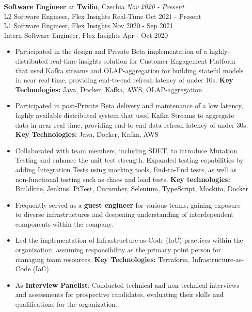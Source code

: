 
{\textbf{Software Engineer} at \textbf{Twilio}, Czechia} 
    \hfill {\em Nov 2020 - Present}\\
    {L2 Software Engineer, Flex Insights Real-Time} \hfill  {Oct 2021 - Present}\\
    {L1 Software Engineer, Flex Insights} \hfill            {Nov 2020 - Sep 2021}\\
    {Intern Software Engineer, Flex Insights} \hfill        {Apr - Oct 2020}
    \begin{itemize}
        \item Participated in the design and Private Beta implementation of a highly-distributed real-time insights solution for Customer Engagement Platform that used Kafka streams and OLAP-aggregation for building stateful models in near real time, providing end-to-end refresh latency of under 10s. \textbf{Key Technologies:} Java, Docker, Kafka, AWS, OLAP-aggregation
        \item Participated in post-Private Beta delivery and maintenance of a low latency, highly available distributed system that used Kafka Streams to aggregate data in near real time, providing end-to-end data refresh latency of under 30s. \textbf{Key Technologies:} Java, Docker, Kafka, AWS
        \item Collaborated with team members, including SDET, to introduce Mutation Testing and enhance the unit test strength. Expanded testing capabilities by adding Integration Tests using mocking tools, End-to-End tests, as well as non-functional testing such as chaos and load tests. \textbf{Key technologies:} Buildkite, Jenkins, PiTest, Cucumber, Selenium, TypeScript, Mockito, Docker
        \item Frequently served as a \textbf{guest engineer} for various teams, gaining exposure to diverse infrastructures and deepening understanding of interdependent components within the company.
        \item Led the implementation of Infrastructure-as-Code (IaC) practices within the organization, assuming responsibility as the primary point person for managing team resources. \textbf{Key Technologies:} Terraform, Infrastructure-as-Code (IaC)
        \item As \textbf{Interview Panelist}: Conducted technical and non-technical interviews and assessments for prospective candidates, evaluating their skills and qualifications for the organization.

\end{itemize}
